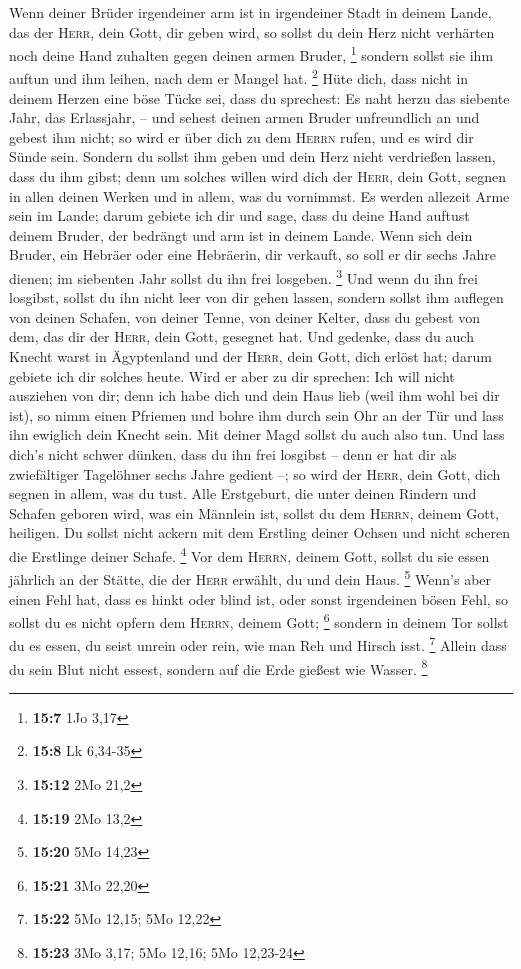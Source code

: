  Wenn deiner Brüder irgendeiner arm ist in irgendeiner
Stadt in deinem Lande, das der \textsc{Herr}, dein Gott, dir geben wird,
so sollst du dein Herz nicht verhärten noch deine Hand zuhalten gegen
deinen armen Bruder, \footnote{\textbf{15:7} 1Jo 3,17} 
sondern sollst sie ihm auftun und ihm leihen, nach dem er Mangel hat.
\footnote{\textbf{15:8} Lk 6,34-35}  Hüte dich, dass nicht
in deinem Herzen eine böse Tücke sei, dass du sprechest: Es naht herzu
das siebente Jahr, das Erlassjahr, -- und sehest deinen armen Bruder
unfreundlich an und gebest ihm nicht; so wird er über dich zu dem
\textsc{Herrn} rufen, und es wird dir Sünde sein. 
Sondern du sollst ihm geben und dein Herz nicht verdrießen lassen, dass
du ihm gibst; denn um solches willen wird dich der \textsc{Herr}, dein
Gott, segnen in allen deinen Werken und in allem, was du vornimmst.
 Es werden allezeit Arme sein im Lande; darum gebiete ich
dir und sage, dass du deine Hand auftust deinem Bruder, der bedrängt und
arm ist in deinem Lande.  Wenn sich dein Bruder, ein
Hebräer oder eine Hebräerin, dir verkauft, so soll er dir sechs Jahre
dienen; im siebenten Jahr sollst du ihn frei losgeben. \footnote{\textbf{15:12}
  2Mo 21,2}  Und wenn du ihn frei losgibst, sollst du ihn
nicht leer von dir gehen lassen,  sondern sollst ihm
auflegen von deinen Schafen, von deiner Tenne, von deiner Kelter, dass
du gebest von dem, das dir der \textsc{Herr}, dein Gott, gesegnet hat.
 Und gedenke, dass du auch Knecht warst in Ägyptenland
und der \textsc{Herr}, dein Gott, dich erlöst hat; darum gebiete ich dir
solches heute.  Wird er aber zu dir sprechen: Ich will
nicht ausziehen von dir; denn ich habe dich und dein Haus lieb (weil ihm
wohl bei dir ist),  so nimm einen Pfriemen und bohre ihm
durch sein Ohr an der Tür und lass ihn ewiglich dein Knecht sein. Mit
deiner Magd sollst du auch also tun.  Und lass dich's
nicht schwer dünken, dass du ihn frei losgibst -- denn er hat dir als
zwiefältiger Tagelöhner sechs Jahre gedient --; so wird der
\textsc{Herr}, dein Gott, dich segnen in allem, was du tust.
 Alle Erstgeburt, die unter deinen Rindern und Schafen
geboren wird, was ein Männlein ist, sollst du dem \textsc{Herrn}, deinem
Gott, heiligen. Du sollst nicht ackern mit dem Erstling deiner Ochsen
und nicht scheren die Erstlinge deiner Schafe. \footnote{\textbf{15:19}
  2Mo 13,2}  Vor dem \textsc{Herrn}, deinem Gott, sollst
du sie essen jährlich an der Stätte, die der \textsc{Herr} erwählt, du
und dein Haus. \footnote{\textbf{15:20} 5Mo 14,23} 
Wenn's aber einen Fehl hat, dass es hinkt oder blind ist, oder sonst
irgendeinen bösen Fehl, so sollst du es nicht opfern dem \textsc{Herrn},
deinem Gott; \footnote{\textbf{15:21} 3Mo 22,20}  sondern
in deinem Tor sollst du es essen, du seist unrein oder rein, wie man Reh
und Hirsch isst. \footnote{\textbf{15:22} 5Mo 12,15; 5Mo 12,22}
 Allein dass du sein Blut nicht essest, sondern auf die
Erde gießest wie Wasser. \footnote{\textbf{15:23} 3Mo 3,17; 5Mo 12,16;
  5Mo 12,23-24}

